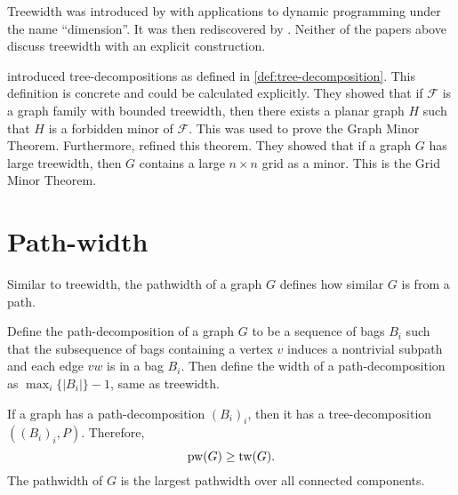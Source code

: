 Treewidth was introduced by \textcite{berteleChapterEliminationVariables1972} with applications to dynamic programming under the name ``dimension''. It was then rediscovered by \textcite{halinSfunctionsGraphs1976}. Neither of the papers above discuss treewidth with an explicit construction.

\textcite{robertsonGraphMinorsIII1984} introduced tree-decompositions as defined in \cref{def:tree-decomposition}. This definition is concrete and could be calculated explicitly. They showed that if $\mathcal{F}$ is a graph family with bounded treewidth, then there exists a planar graph $H$ such that $H$ is a forbidden minor of $\mathcal{F}$. This was used to prove the Graph Minor Theorem. Furthermore, \textcite{robertsonQuicklyExcludingPlanar1994} refined this theorem. They showed that if a graph $G$ has large treewidth, then $G$ contains a large $n \times n$ grid as a minor. This is the Grid Minor Theorem.


\section{Path-width}\label{sec:Pathwidth}
Similar to treewidth, the pathwidth of a graph \(G\) defines how similar $G$ is from a path.

Define the path-decomposition of a graph \(G\) to be a sequence of bags \(B_i\) such that the subsequence of bags containing a vertex \(v\) induces a nontrivial subpath and each edge \(vw\) is in a bag \(B_i\). Then define the width of a path-decomposition as \(\max_i \lbrace |B_i| \rbrace -1\), same as treewidth.

If a graph has a path-decomposition \({(B_i)}_i\), then it has a tree-decomposition \(\left({(B_i)}_i, P\right)\). Therefore,
\begin{equation*}
	\operatorname{pw}(G) \geq \operatorname{tw}(G).
\end{equation*}
The pathwidth of \(G\) is the largest pathwidth over all connected components.

